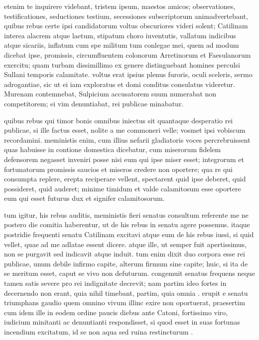  etenim te inquirere videbant, tristem ipsum, maestos amicos; observationes, testificationes, seductiones testium, secessiones subscriptorum animadvertebant, quibus rebus certe ipsi candidatorum voltus obscuriores videri solent; Catilinam interea alacrem atque laetum, stipatum choro iuventutis, vallatum indicibus atque sicariis, inflatum cum spe militum tum conlegae mei, quem ad modum dicebat ipse, promissis, circumfluentem colonorum Arretinorum et Faesulanorum exercitu; quam turbam dissimillimo ex genere distinguebant homines perculsi Sullani temporis calamitate. voltus erat ipsius plenus furoris, oculi sceleris, sermo adrogantiae, sic ut ei iam exploratus et domi conditus consulatus videretur. Murenam contemnebat, Sulpicium accusatorem suum numerabat non competitorem; ei vim denuntiabat, rei publicae minabatur.

 quibus rebus qui timor bonis omnibus iniectus sit quantaque desperatio rei publicae, si ille factus esset, nolite a me commoneri velle; vosmet ipsi vobiscum recordamini. meministis enim, cum illius nefarii gladiatoris voces percrebruissent quas habuisse in contione domestica dicebatur, cum miserorum fidelem defensorem negasset inveniri posse nisi eum qui ipse miser esset; integrorum et fortunatorum promissis saucios et miseros credere non oportere; qua re qui consumpta replere, erepta reciperare vellent, spectarent quid ipse deberet, quid possideret, quid auderet; minime timidum et valde calamitosum esse oportere eum qui esset futurus dux et signifer calamitosorum.

 tum igitur, his rebus auditis, meministis fieri senatus consultum referente me ne postero die comitia haberentur, ut de his rebus in senatu agere possemus. itaque postridie frequenti senatu Catilinam excitavi atque eum de his rebus iussi, si quid vellet, quae ad me adlatae essent dicere. atque ille, ut semper fuit apertissimus, non se purgavit sed indicavit atque induit. tum enim dixit duo corpora esse rei publicae, unum debile infirmo capite, alterum firmum sine capite; huic, si ita de se meritum esset, caput se vivo non defuturum. congemuit senatus frequens neque tamen satis severe pro rei indignitate decrevit; nam partim ideo fortes in decernendo non erant, quia nihil timebant, partim, quia omnia . erupit e senatu triumphans gaudio quem omnino vivum illinc exire non oportuerat, praesertim cum idem ille in eodem ordine paucis diebus ante Catoni, fortissimo viro, iudicium minitanti ac denuntianti respondisset, si quod esset in suas fortunas incendium excitatum, id se non aqua sed ruina restincturum .

